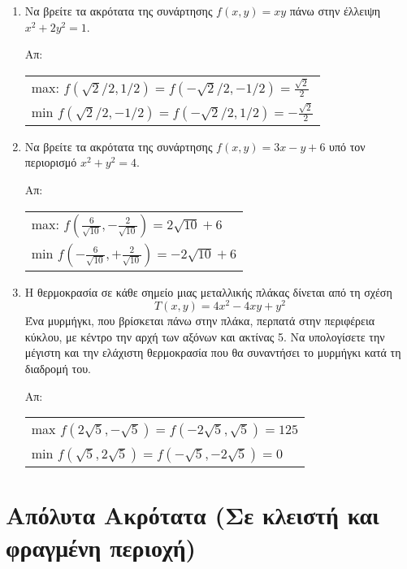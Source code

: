 \begin{enumerate}
  \item Να βρείτε τα ακρότατα της συνάρτησης $ f(x,y) = xy $ πάνω στην έλλειψη 
    $ x^{2}+2y^{2}=1 $.

    \hfill Απ: 
    \begin{tabular}{l}
      max: $ f(\sqrt{2} /2, 1/2) = f(- \sqrt{2} /2, -1/2) = \frac{\sqrt{2}}{2} $ \\
      min $ f(\sqrt{2} /2, -1/2) = f(- \sqrt{2} /2, 1/2) = -\frac{\sqrt{2}}{2} $ \\
    \end{tabular}

  \item Να βρείτε τα ακρότατα της συνάρτησης $ f(x,y) = 3x-y+6 $ υπό τον περιορισμό 
    $ x^{2}+y^{2}=4 $.

    \hfill Απ:  
    \begin{tabular}{l}
      max: $ f(\frac{6}{\sqrt{10}} , - \frac{2}{\sqrt{10}}) = 2 \sqrt{10} +6 $ \\
      min $ f(-\frac{6}{\sqrt{10}} , + \frac{2}{\sqrt{10}}) = -2 \sqrt{10} +6 $ \\
    \end{tabular}

  \item Η θερμοκρασία σε κάθε σημείο μιας μεταλλικής πλάκας δίνεται από τη σχέση
    \[
      T(x,y) = 4x^{2}-4xy+y^2 
    \]
    Ένα μυρμήγκι, που βρίσκεται πάνω στην πλάκα, περπατά στην περιφέρεια κύκλου, 
    με κέντρο την αρχή των αξόνων και ακτίνας 5. Να υπολογίσετε την μέγιστη και την 
    ελάχιστη θερμοκρασία που θα συναντήσει το μυρμήγκι κατά τη διαδρομή του.

    \hfill Απ:  
    \begin{tabular}{l}
      max $ f(2 \sqrt{5} , - \sqrt{5}) = f(-2 \sqrt{5} , \sqrt{5}) = 125 $ \\
      min $ f(\sqrt{5} , 2 \sqrt{5}) = f(- \sqrt{5} , - 2 \sqrt{5}) = 0 $ 
    \end{tabular}
\end{enumerate}


\section*{Απόλυτα Ακρότατα (Σε κλειστή και φραγμένη περιοχή)}

